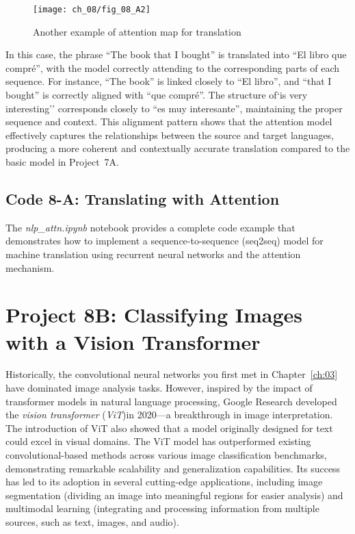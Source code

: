 \begin{figure}[H]
    \texttt{[image: ch\_08/fig\_08\_A2]}
    \caption{Another example of attention map for translation}
    \label{fig:08:A:attn_map2}
\end{figure}

In this case, the phrase ``The book that I bought'' is translated into ``El libro que compré'', with the model correctly attending  to the corresponding parts of each sequence. For instance, ``The book'' is linked closely to ``El libro'', and ``that I bought'' is correctly aligned with ``que compré''. The structure of`is very interesting'' corresponds closely to ``es muy interesante'', maintaining the proper sequence and context. This alignment pattern shows that the attention model effectively captures the relationships between the source and target languages, producing a more coherent and contextually accurate translation compared to the basic model in Project~7A.

\subsection{Code 8-A: Translating with Attention}

The \emph{nlp\_attn.ipynb} notebook provides a complete code example that demonstrates how to implement a sequence-to-sequence (seq2seq) model for machine translation using recurrent neural networks and the attention mechanism.

\section{Project 8B: Classifying Images with a Vision Transformer}

Historically, the convolutional neural networks you first met in Chapter~\ref{ch:03} have dominated image analysis tasks. However, inspired by the impact of transformer models in natural language processing,  Google Research developed the \emph{vision transformer} (\emph{ViT})in 2020---a breakthrough in image interpretation. The introduction of ViT also showed that a model originally designed for text could excel in visual domains. The ViT model has outperformed existing convolutional-based methods across various image classification benchmarks, demonstrating remarkable scalability and generalization capabilities. Its success has led to its adoption in several cutting-edge applications, including image segmentation (dividing an image into meaningful regions for easier analysis) and multimodal learning (integrating and processing information from multiple sources, such as text, images, and audio).

